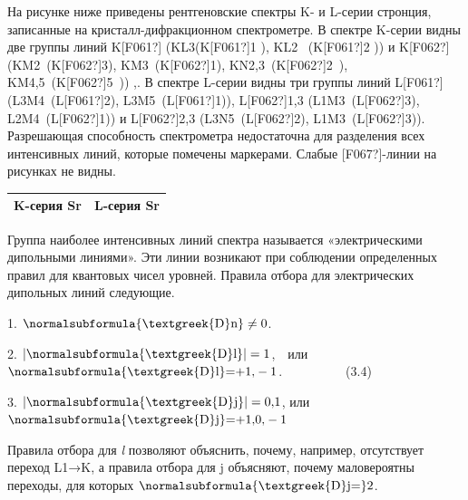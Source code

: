 \documentclass[a4paper,14pt, openany, twoside, draft]{extbook} %
\begin{document}
На рисунке ниже приведены рентгеновские спектры K- и L-серии стронция, записанные на кристалл-дифракционном спектрометре. В спектре K-серии видны две группы линий K\textlatin{[F061?]} (KL3(K\textlatin{[F061?]}1 ),  KL2~ (K\textlatin{[F061?]}2 )) и K\textlatin{[F062?]} (KM2~(K\textlatin{[F062?]}3), KM3~(K\textlatin{[F062?]}1), KN2,3~(K\textlatin{[F062?]}2~), KM4,5~(K\textlatin{[F062?]}5~)) ,. В спектре L-серии видны три группы линий L\textlatin{[F061?]} (L3M4~(L\textlatin{[F061?]}2), L3M5~(L\textlatin{[F061?]}1)), L\textlatin{[F062?]}1,3 (L1M3~(L\textlatin{[F062?]}3), L2M4~(L\textlatin{[F062?]}1)) и L\textlatin{[F062?]}2,3 (L3N5~(L\textlatin{[F062?]}2), L1M3~(L\textlatin{[F062?]}3)). Разрешающая способность спектрометра недостаточна для разделения всех интенсивных линий, которые помечены маркерами. Слабые \textlatin{[F067?]}-линии на рисунках не видны.

\begin{flushleft}
\tablefirsthead{}
\tablehead{}
\tabletail{}
\tablelasttail{}
\begin{supertabular}{|m{7.7970004cm}|m{7.84cm}|}
\hline
{\centering{} K-серия Sr\par}

 &
{\centering{} L{}-серия Sr\par}

\centering{}\\\hline
\end{supertabular}
\end{flushleft}
Группа наиболее интенсивных линий спектра называется «электрическими дипольными линиями». Эти линии возникают при соблюдении определенных правил для квантовых чисел уровней. Правила отбора для электрических дипольных линий следующие.

1.   $\normalsubformula{\text{\textgreek{D}n}}\neq 0$.\ \ \ \ \ \ \ \ \ \ \ \ \ \

2.   $|\normalsubformula{\text{\textgreek{D}l}}|=1$,\ \  или \ \  $\normalsubformula{\text{\textgreek{D}l}}\text{=+1,}-1$.\ \ \ \ \ \ \ \ \ \ (3.4)

3.   $|\normalsubformula{\text{\textgreek{D}j}}|=\text{0,1}$, или\ \  $\normalsubformula{\text{\textgreek{D}j}}\text{=+1,0,}-1$\ \ \ \ \ \ \ \

Правила отбора для \emph{l} позволяют объяснить, почему, например, отсутствует переход L1→K, а правила отбора для j объясняют, почему маловероятны переходы, для которых  $\normalsubformula{\text{\textgreek{D}j=}}2$.
\end{document}
